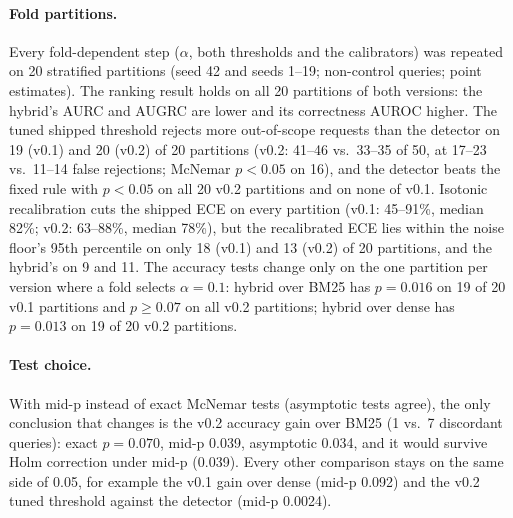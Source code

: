 \begin{table}[t]
  \centering
  \small
  
  \caption{Sensitivity to bare-keyword ambiguous queries (post hoc; canonical controls included). Cells show the
  hybrid's accuracy gain in points over BM25 and over dense retrieval, with the exact McNemar $p$ (unadjusted); ECE
  red.\ is the relative ECE reduction from isotonic calibration re-fit on the subset; $n$ counts non-OOD queries.
  Fusion weight and thresholds were not re-tuned.}
  \label{tab:sens}
\end{table}

\paragraph{Fold partitions.} Every fold-dependent step ($\alpha$, both thresholds and the calibrators) was repeated on
20 stratified partitions (seed 42 and seeds 1--19; non-control queries; point estimates). The ranking result holds
on all 20 partitions of both versions: the hybrid's AURC and AUGRC are lower and its correctness AUROC higher. The
tuned shipped threshold rejects more out-of-scope requests than the detector on 19 (v0.1) and 20 (v0.2) of 20
partitions (v0.2: 41--46 vs.\ 33--35 of 50, at 17--23 vs.\ 11--14 false rejections; McNemar $p<0.05$ on 16), and the
detector beats the fixed rule with $p<0.05$ on all 20 v0.2 partitions and on none of v0.1. Isotonic recalibration cuts
the shipped ECE on every partition (v0.1: 45--91\%, median 82\%; v0.2: 63--88\%, median 78\%), but the recalibrated
ECE lies within the noise floor's 95th percentile on only 18 (v0.1) and 13 (v0.2) of 20 partitions, and the hybrid's
on 9 and 11. The accuracy tests change only on the one partition per version where a fold selects $\alpha=0.1$:
hybrid over BM25 has $p=0.016$ on 19 of 20 v0.1 partitions and $p\geq0.07$ on all v0.2 partitions; hybrid over dense
has $p=0.013$ on 19 of 20 v0.2 partitions.

\paragraph{Test choice.} With mid-p instead of exact McNemar tests (asymptotic tests agree), the only conclusion that
changes is the v0.2 accuracy gain over BM25 (1 vs.\ 7 discordant queries): exact $p=0.070$, mid-p 0.039, asymptotic
0.034, and it would survive Holm correction under mid-p (0.039). Every other comparison stays on the same side of
0.05, for example the v0.1 gain over dense (mid-p 0.092) and the v0.2 tuned threshold against the detector (mid-p
0.0024).

